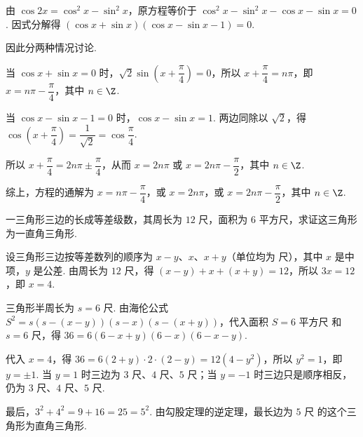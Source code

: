 \documentclass[UTF8,a4paper,oneside,11pt]{ctexbook}
\begin{document}
\begin{solution}
由 \(\cos 2x=\cos^{2}x-\sin^{2}x\)，原方程等价于 \(\cos^{2}x-\sin^{2}x-\cos x-\sin x=0\). 因式分解得 \(\left(\cos x+\sin x\right)\left(\cos x-\sin x-1\right)=0\).

因此分两种情况讨论.

当 \(\cos x+\sin x=0\) 时，\(\sqrt{2}\sin\left(x+\dfrac{\pi}{4}\right)=0\)，所以 \(x+\dfrac{\pi}{4}=n\pi\)，即 \(x=n\pi-\dfrac{\pi}{4}\)，其中 \(n\in\Z\).

当 \(\cos x-\sin x-1=0\) 时，\(\cos x-\sin x=1\). 两边同除以 \(\sqrt{2}\)，得 \(\cos\left(x+\dfrac{\pi}{4}\right)=\dfrac{1}{\sqrt{2}}=\cos\dfrac{\pi}{4}\).

所以 \(x+\dfrac{\pi}{4}=2n\pi\pm\dfrac{\pi}{4}\)，从而 \(x=2n\pi\) 或 \(x=2n\pi-\dfrac{\pi}{2}\)，其中 \(n\in\Z\).

综上，方程的通解为 \(x=n\pi-\dfrac{\pi}{4}\)，或 \(x=2n\pi\)，或 \(x=2n\pi-\dfrac{\pi}{2}\)，其中 \(n\in\Z\).
\end{solution}

\begin{problem}
一三角形三边的长成等差级数，其周长为 \(12\text{ 尺}\)，面积为 \(6\text{ 平方尺}\)，求证这三角形为一直角三角形.
\end{problem}

\begin{solution}
设三角形三边按等差数列的顺序为 \(x-y\)、\(x\)、\(x+y\)（单位均为 \(\text{尺}\)），其中 \(x\) 是中项，\(y\) 是公差. 由周长为 \(12\text{ 尺}\)，得 \((x-y)+x+(x+y)=12\)，所以 \(3x=12\)，即 \(x=4\).

三角形半周长为 \(s=6\text{ 尺}\). 由海伦公式 \(S^{2}=s\left(s-(x-y)\right)\left(s-x\right)\left(s-(x+y)\right)\)，代入面积 \(S=6\text{ 平方尺}\) 和 \(s=6\text{ 尺}\)，得 \(36=6(6-x+y)(6-x)(6-x-y)\).

代入 \(x=4\)，得 \(36=6(2+y)\cdot 2\cdot(2-y)=12(4-y^{2})\)，所以 \(y^{2}=1\)，即 \(y=\pm1\). 当 \(y=1\) 时三边为 \(3\text{ 尺}\)、\(4\text{ 尺}\)、\(5\text{ 尺}\)；当 \(y=-1\) 时三边只是顺序相反，仍为 \(3\text{ 尺}\)、\(4\text{ 尺}\)、\(5\text{ 尺}\).

最后，\(3^{2}+4^{2}=9+16=25=5^{2}\). 由勾股定理的逆定理，最长边为 \(5\text{ 尺}\) 的这个三角形为直角三角形.
\end{solution}

\end{document}
